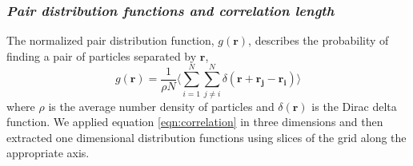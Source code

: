 \documentclass[journal=jpcbfk,manuscript=article]{achemso}
\begin{document}
%
  
  \subsubsection{\textit{Pair distribution functions and correlation length}}\label{section:correlation_length}

  The normalized pair distribution function, $g(\mathbf{r})$, describes
  the probability of finding a pair of particles separated by $\mathbf{r}$,
  \begin{equation}
	g(\mathbf{r})= \frac{1}{\rho N} \Bigg \langle \sum_{i=1}^{N}\sum_{j\neq i}^{N} \delta(\mathbf{r}+\mathbf{r_j}-\mathbf{r_i}) \Bigg \rangle
	\label{eqn:correlation}
  \end{equation}
  where $\rho$ is the average number density of particles and
  $\delta(\mathbf{r})$ is the Dirac delta function\cite{kuriabova_linear_2010}.
  We applied equation \ref{eqn:correlation} in three dimensions and then
  extracted one dimensional distribution functions using slices of the grid
  along the appropriate axis.
\end{document}
